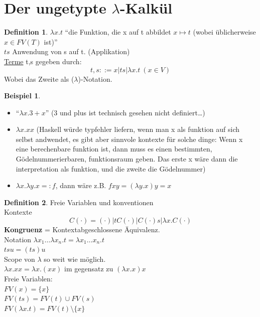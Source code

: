 \documentclass{article}
\theoremstyle{definition}
\newtheorem{beispiel}{Beispiel}[section]
\newtheorem{definition}{Definition}[section]
\begin{document}
	\section{Der ungetypte $\lambda$-Kalkül}
	\begin{definition}
	$\lambda x.t$ ``die Funktion, die x auf t abbildet $x\mapsto t$ (wobei üblicherweise $x\in FV(T)$ ist)''\\
	$ts$ Anwendung von s auf t. (Applikation)\\
	\underline{Terme} t,s gegeben durch:\\
	\[t,s::= x|ts|\lambda x.t\: (x\in V)\]
	Wobei das Zweite als ($\lambda$)-Notation.
	\end{definition}
	\begin{beispiel}\hfill
	\begin{itemize}
	\item ``$\lambda x.3+x$'' (3 und plus ist technisch gesehen nicht definiert\dots)
	\item $\lambda x. xx$ (Haskell würde typfehler liefern, wenn man x als funktion auf sich selbst andwendet, es gibt aber sinnvole kontexte für solche dinge: Wenn x eine berechenbare funktion ist, dann muss es einen bestimmten, Gödelnummerierbaren, funktionsraum geben. Das erste x wäre dann die interpretation als funktion, und die zweite die Gödelnummer)
	\item $\lambda x.\lambda y. x=: f$, dann wäre z.B. $f x y = (\lambda y.x) y = x$
	\end{itemize}
	\end{beispiel}
	\begin{definition} Freie Variablen und konventionen\\
	Kontexte
	 \[C(\cdot)=(\cdot)|tC(\cdot)|C(\cdot)s|\lambda x.C(\cdot)\]
	\textbf{Kongruenz} = Kontextabgeschlossene Äquivalenz.\\
	Notation $\lambda x_1\dots\lambda x_n. t = \lambda x_1\dots x_n.t$\\
	$tsu = (ts)u$\\
	Scope von $\lambda$ so weit wie möglich.\\
	$\lambda x.xx= \lambda x.(xx) $ im gegensatz zu $ (\lambda x.x)x$\\
	Freie Variablen:\\
	$FV(x)=\{x\}$\\
	$FV(ts)=FV(t)\cup FV(s)$\\
	$FV(\lambda x.t)= FV(t)\setminus \{x\}$\\
	\end{definition}
\end{document}
